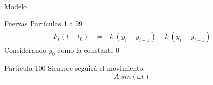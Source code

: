 \begin{frame}{Modelo}
    \begin{block}{Fuerzas Partículas 1 a 99}
        \begin{equation*}
            \begin{aligned}
                F_i(t+t_0) &= -k\ (y_i - y_{i-1}) - k\ (y_i - y_{i+1})
            \end{aligned}\label{eq:equation-particles-movement}
        \end{equation*}
        Considerando \( y_0 \) como la constante 0
    \end{block}

    \begin{block}{Partícula 100}
        Siempre seguirá el movimiento: \begin{equation*}A\ sin(\omega t)\end{equation*}
    \end{block}
\end{frame}


